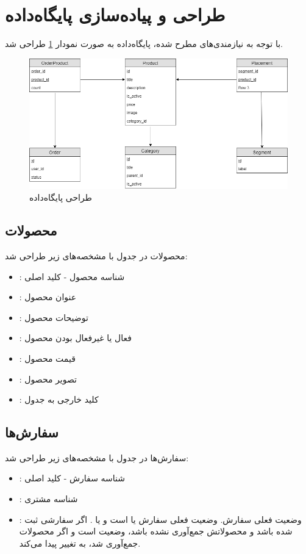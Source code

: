 \section{طراحی و پیاده‌سازی پایگاه‌داده}
با توجه به نیازمندی‌های مطرح شده، پایگاه‌داده به صورت نمودار \ref{uml} طراحی شد.

\begin{figure}[t!]
    \centering
    \includegraphics[scale=0.5]{figures/uml.png}
    \caption{طراحی پایگاه‌داده }
    \label{uml}
\end{figure}

\subsection{محصولات}
محصولات در جدول  با مشخصه‌های زیر طراحی شد:

\begin{itemize}
   	\item \textbf{}: شناسه محصول - کلید اصلی
   	\item \textbf{}: عنوان محصول 
	\item \textbf{}: توضیحات محصول
	\item \textbf{}: فعال یا غیرفعال بودن محصول
	\item \textbf{}: قیمت محصول
	\item \textbf{}: تصویر محصول
	\item \textbf{}: کلید خارجی به جدول 
\end{itemize}

\subsection{سفارش‌ها}
سفارش‌ها در جدول  با مشخصه‌های زیر طراحی شد:
\begin{itemize}
   	\item \textbf{}: شناسه سفارش - کلید اصلی
   	\item \textbf{}: شناسه مشتری 
	\item \textbf{}: وضعیت فعلی سفارش. وضعیت فعلی سفارش یا  است و یا . اگر سفارشی ثبت شده باشد و محصولاتش جمع‌آوری نشده باشد، وضعیت  است و اگر محصولات جمع‌آوری شد، به  تغییر پیدا می‌کند.
\end{itemize}

